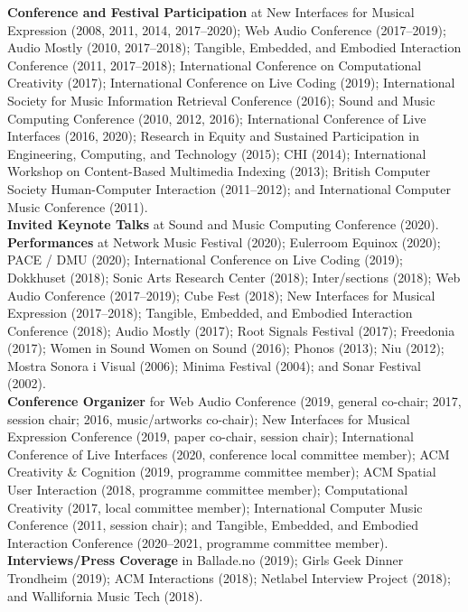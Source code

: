 \documentclass[10pt, a4paper]{article}
\begin{document}
{\textbf{Conference and Festival Participation}} at New Interfaces for Musical Expression (2008, 2011, 2014, 2017--2020); Web Audio Conference (2017--2019); Audio Mostly (2010, 2017--2018); Tangible, Embedded, and Embodied Interaction Conference (2011, 2017--2018); International Conference on Computational Creativity (2017); International Conference on Live Coding (2019); International Society for Music Information Retrieval Conference (2016); Sound and Music Computing Conference (2010, 2012, 2016); International Conference of Live Interfaces (2016, 2020); Research in Equity and Sustained Participation in Engineering, Computing, and Technology (2015); CHI (2014); International Workshop on Content-Based Multimedia Indexing (2013); British Computer Society Human-Computer Interaction (2011--2012); and International Computer Music Conference (2011).\\

{\textbf{Invited Keynote Talks}} at Sound and Music Computing Conference (2020).\\

{\textbf{Performances}} at Network Music Festival (2020); Eulerroom Equinox (2020); PACE / DMU (2020); International Conference on Live Coding (2019); Dokkhuset (2018); Sonic Arts Research Center (2018); Inter/sections (2018); Web Audio Conference (2017--2019); Cube Fest (2018); New Interfaces for Musical Expression (2017--2018); Tangible, Embedded, and Embodied Interaction Conference (2018); Audio Mostly (2017); Root Signals Festival (2017); Freedonia (2017); Women in Sound Women on Sound (2016); Phonos (2013); Niu (2012); Mostra Sonora i Visual (2006); Minima Festival (2004); and Sonar Festival (2002).\\

{\textbf{Conference Organizer}} for Web Audio Conference (2019, general co-chair; 2017, session chair; 2016, music/artworks co-chair); New Interfaces for Musical Expression Conference (2019, paper co-chair, session chair); International Conference of Live Interfaces (2020, conference local committee member); ACM Creativity \& Cognition (2019, programme committee member); ACM Spatial User Interaction (2018, programme committee member); Computational Creativity (2017, local committee member); International Computer Music Conference (2011, session chair); and Tangible, Embedded, and Embodied Interaction Conference (2020--2021, programme committee member).\\

{\textbf{Interviews/Press Coverage}} in Ballade.no (2019); Girls Geek Dinner Trondheim (2019); ACM Interactions (2018); Netlabel Interview Project (2018); and Wallifornia Music Tech (2018).\\
\end{document}
